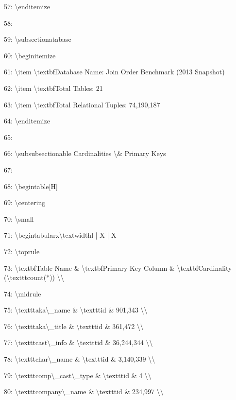 \documentclass[11pt,a4paper]{article}
\begin{document}
{57: \textbackslash{}end{itemize}

58:

59: \textbackslash{}subsection{atabase}

60: \textbackslash{}begin{itemize}

61: \textbackslash{}item \textbackslash{}textbf{Database Name}: Join Order Benchmark (2013 Snapshot)

62: \textbackslash{}item \textbackslash{}textbf{Total Tables}: 21

63: \textbackslash{}item \textbackslash{}textbf{Total Relational Tuples}: 74,190,187

64: \textbackslash{}end{itemize}

65:

66: \textbackslash{}subsubsection{able Cardinalities \textbackslash{}\& Primary Keys}

67:

68: \textbackslash{}begin{table}[H]

69: \textbackslash{}centering

70: \textbackslash{}small

71: \textbackslash{}begin{tabularx}{\textbackslash{}textwidth}{l | X | X}

72: \textbackslash{}toprule

73: \textbackslash{}textbf{Table Name} \& \textbackslash{}textbf{Primary Key Column} \& \textbackslash{}textbf{Cardinality (\textbackslash{}texttt{count(*)})} \textbackslash{}\textbackslash{}

74: \textbackslash{}midrule

75: \textbackslash{}texttt{aka\textbackslash{}\_name} \& \textbackslash{}texttt{id} \& 901,343 \textbackslash{}\textbackslash{}

76: \textbackslash{}texttt{aka\textbackslash{}\_title} \& \textbackslash{}texttt{id} \& 361,472 \textbackslash{}\textbackslash{}

77: \textbackslash{}texttt{cast\textbackslash{}\_info} \& \textbackslash{}texttt{id} \& 36,244,344 \textbackslash{}\textbackslash{}

78: \textbackslash{}texttt{char\textbackslash{}\_name} \& \textbackslash{}texttt{id} \& 3,140,339 \textbackslash{}\textbackslash{}

79: \textbackslash{}texttt{comp\textbackslash{}\_cast\textbackslash{}\_type} \& \textbackslash{}texttt{id} \& 4 \textbackslash{}\textbackslash{}

80: \textbackslash{}texttt{company\textbackslash{}\_name} \& \textbackslash{}texttt{id} \& 234,997 \textbackslash{}\textbackslash{}

}
\end{document}
